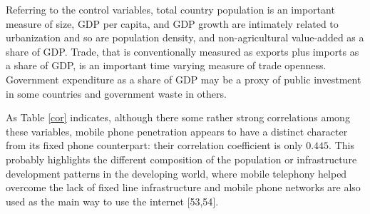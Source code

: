 \documentclass[10pt,letterpaper]{article}
\begin{document}
Referring to the control variables, total country population is an
important measure of size, GDP per capita, and GDP growth are intimately
related to urbanization and so are population density, and
non-agricultural value-added as a share of GDP. Trade, that is
conventionally measured as exports plus imports as a share of GDP, is an
important time varying measure of trade openness. Government expenditure
as a share of GDP may be a proxy of public investment in some countries
and government waste in others.

\color{blue}

As Table \ref{cor} indicates, although there some rather strong
correlations among these variables, mobile phone penetration appears to
have a distinct character from its fixed phone counterpart: their
correlation coefficient is only \(0.445\). This probably highlights the
different composition of the population or infrastructure development
patterns in the developing world, where mobile telephony helped overcome
the lack of fixed line infrastructure and mobile phone networks are also
used as the main way to use the internet {[}53,54{]}.
\end{document}
